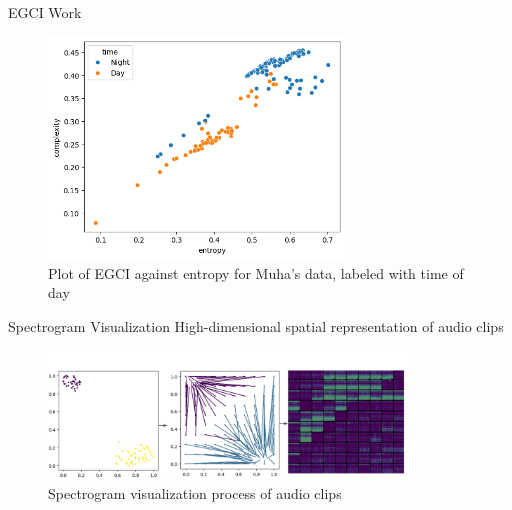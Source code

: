 \begin{frame}{EGCI Work}
    \begin{figure}
        \includegraphics[height=0.7\textheight,width=0.7\textwidth,keepaspectratio]{images/muha_egci.png}
        \caption{Plot of EGCI against entropy for Muha's data, labeled with time of day}
    \end{figure}
\end{frame}

\begin{frame}{Spectrogram Visualization}
    High-dimensional spatial representation of audio clips
    \begin{figure}
        \centering
        \includegraphics[height=0.85\textheight,width=0.85\textwidth,keepaspectratio]{images/spectrogram_visualization.png}
        \caption{Spectrogram visualization process of audio clips}
    \end{figure}
\end{frame}

